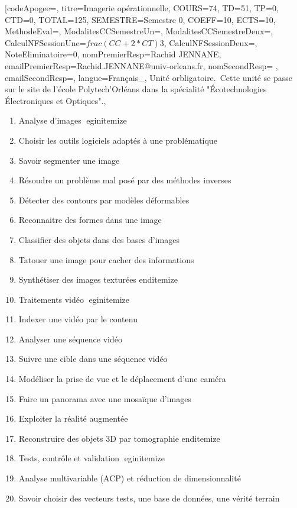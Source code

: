 \vfill


\module[codeApogee={},
titre={Imagerie opérationnelle},
COURS={74},
TD={51},
TP={0},
CTD={0},
TOTAL={125},
SEMESTRE={Semestre 0},
COEFF={10},
ECTS={10},
MethodeEval={},
ModalitesCCSemestreUn={},
ModalitesCCSemestreDeux={},
CalculNFSessionUne={$frac{(CC+2*CT)}{3}$},
CalculNFSessionDeux={},
NoteEliminatoire={0},
nomPremierResp={Rachid JENNANE},
emailPremierResp={Rachid.JENNANE@univ-orleans.fr},
nomSecondResp={ },
emailSecondResp={},
langue={Français_},
{Unité orbligatoire.\
Cette unité se passe sur le site de l'école Polytech'Orléans dans la spécialité "Écotechnologies Électroniques et Optiques".},
{\begin{enumerate}
\item  Analyse d'images
 egin{itemize}
 \item  Choisir les outils logiciels adaptés à une problématique
 \item  Savoir segmenter une image
 \item  Résoudre un problème mal posé par des méthodes inverses
 \item  Détecter des contours par modèles déformables
 \item  Reconnaitre des formes dans une image
 \item  Classifier des objets dans des bases d'images
 \item  Tatouer une image pour cacher des informations
 \item  Synthétiser des images texturées
 end{itemize}
\item  Traitements vidéo
 egin{itemize}
 \item  Indexer une vidéo par le contenu
 \item  Analyser une séquence vidéo
 \item  Suivre une cible dans une séquence vidéo
 \item  Modéliser la prise de vue et le déplacement d'une caméra 
 \item  Faire un panorama avec une mosaïque d'images
 \item  Exploiter la réalité augmentée 
 \item  Reconstruire des objets 3D par tomographie 
 end{itemize}
\item  Tests, contrôle et validation
 egin{itemize}
 \item  Analyse multivariable (ACP) et réduction de dimensionnalité
 \item  Savoir choisir des vecteurs tests, une base de données, une vérité terrain

\end{enumerate}}
